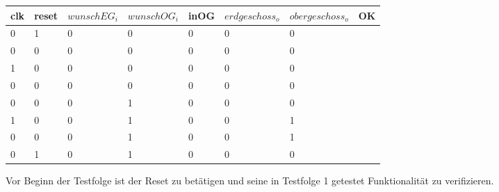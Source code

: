 \documentclass[a4paper,12pt,bibtotocnumbered]{scrartcl} %
\numberwithin{equation}{section} %
\begin{document}
\begin{table}[H]
	\begin{tabular}{lllll|lll}
		clk & reset & $wunschEG_i$ & $wunschOG_i$ & \multicolumn{1}{l|}{inOG} & $erdgeschoss_o$ & $obergeschoss_o$ & OK\\ \hline
		0   & 1     & 0        & 0        & \multicolumn{1}{l|}{0}    & 0              & 0 &                \\
		0   & 0     & 0        & 0        & \multicolumn{1}{l|}{0}    & 0              & 0 &                \\
		1   & 0     & 0        & 0        & \multicolumn{1}{l|}{0}    & 0              & 0 &                \\
		0   & 0     & 0        & 0        & \multicolumn{1}{l|}{0}    & 0              & 0 &                \\
		0   & 0     & 0        & 1        & \multicolumn{1}{l|}{0}    & 0              & 0 &                \\ \hline
		1   & 0     & 0        & 1        & \multicolumn{1}{l|}{0}    & 0              & 1 &                \\
		0   & 0     & 0        & 1        & \multicolumn{1}{l|}{0}    & 0              & 1 &                \\
		0   & 1     & 0        & 1        & \multicolumn{1}{l|}{0}    & 0              & 0 & 
	\end{tabular}
\end{table}
Vor Beginn der Testfolge ist der Reset zu betätigen und seine in Testfolge 1 getestet Funktionalität zu verifizieren.
\end{document}
